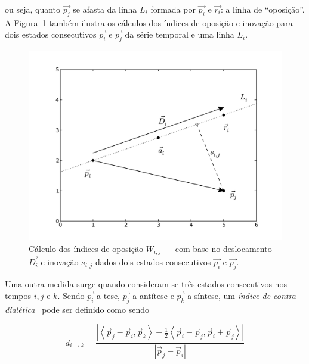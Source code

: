 \noindent ou seja, quanto $\vec{p_j}$ se afasta da linha $L_i$ formada por $\vec{p_i}$ e
$\vec{r_i}$: a linha de ``oposição''.  A Figura~\ref{fig:desc_opos_inov} também
ilustra os cálculos dos índices de oposição e inovação para dois estados
consecutivos $\vec{p_i}$ e $\vec{p_j}$ da série temporal e uma linha $L_i$.

\begin{figure}[ht!]
\begin{center}
        \includegraphics[scale=.6]{figs/desc_opos.pdf}
      \caption{Cálculo dos índices de oposição $W_{i,j}$ --- com base
        no deslocamento $\vec{D_i}$ e inovação $s_{i,j}$ dados dois
        estados consecutivos $\vec{p_i}$ e $\vec{p_j}$.}
        \label{fig:desc_opos_inov}
\end{center}
\end{figure}

Uma outra medida surge quando consideram-se três estados consecutivos
nos tempos $i,j$ e $k$. Sendo $\vec{p_i}$ a tese, $\vec{p_j}$ a
antítese e $\vec{p_k}$ a síntese, um \emph{índice de
  contra-dialética}~\cite{vieira} pode ser definido como sendo


\begin{equation}
d_{i \rightarrow k} = 
      \frac{|\left< \vec{p}_j-\vec{p}_i,\vec{p}_k \right> + 
        \frac{1}{2}\left<\vec{p}_i-\vec{p}_j, \vec{p}_i+\vec{p}_j\right>|}
           {|\vec{p}_j-\vec{p}_i|}
\end{equation}

